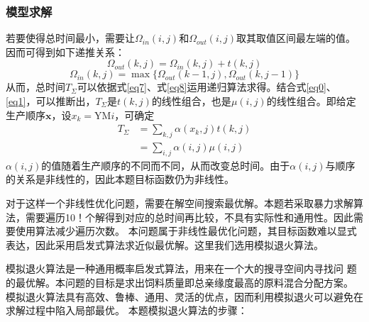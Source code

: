\documentclass[UTF8]{ctexart}
\begin{document}
	\subsubsection{模型求解}
	若要使得总时间最小，需要让$\Omega_{in}(i,j)$和$\Omega_{out}(i,j)$取其取值区间最左端的值。因而可得到如下递推关系：
	\begin{equation}
		\Omega_{out}(k,j)=\Omega_{in}(k,j)+t(k,j)
		\label{eq7}
	\end{equation}
	\begin{equation}
		\Omega_{in}(k,j)=\max\{\Omega_{out}(k-1,j),\Omega_{out}(k,j-1)\}
		\label{eq8}
	\end{equation}
	从而，总时间$T_{\Sigma}$可以依据式\ref{eq7}、式\ref{eq8}运用递归算法求得。结合式\ref{eq0}、\ref{eq1}，可以推断出，$T_{\Sigma}$是$t(k,j)$的线性组合，也是$\mu(i,j)$的线性组合。即给定生产顺序$\boldsymbol{x}$，设$x_{k}=$YM$i$，可确定
	\begin{equation}
	\begin{split}
		T_{\Sigma}&=\sum_{k,j}\alpha(x_{k},j)t(k,j)\\
		&=\sum_{i,j}\alpha(i,j)\mu(i,j)
		\label{linear}
	\end{split}
	\end{equation}
	$\alpha(i,j)$的值随着生产顺序的不同而不同，从而改变总时间。由于$\alpha(i,j)$与顺序的关系是非线性的，因此本题目标函数仍为非线性。
	\par 对于这样一个非线性优化问题，需要在解空间搜索最优解。本题若采取暴力求解算法，需要遍历10！个解得到对应的总时间再比较，不具有实际性和通用性。因此需要使用算法减少遍历次数。
	本问题属于非线性最优化问题，其目标函数难以显式表达，因此采用启发式算法求近似最优解。这里我们选用模拟退火算法。 
	\par 模拟退火算法是一种通用概率启发式算法，用来在一个大的搜寻空间内寻找问 题的最优解。本问题的目标是求出饲料质量即总亲缘度最高的原料混合分配方案。 模拟退火算法具有高效、鲁棒、通用、灵活的优点，因而利用模拟退火可以避免在 求解过程中陷入局部最优。
	本题模拟退火算法的步骤：
\end{document}
